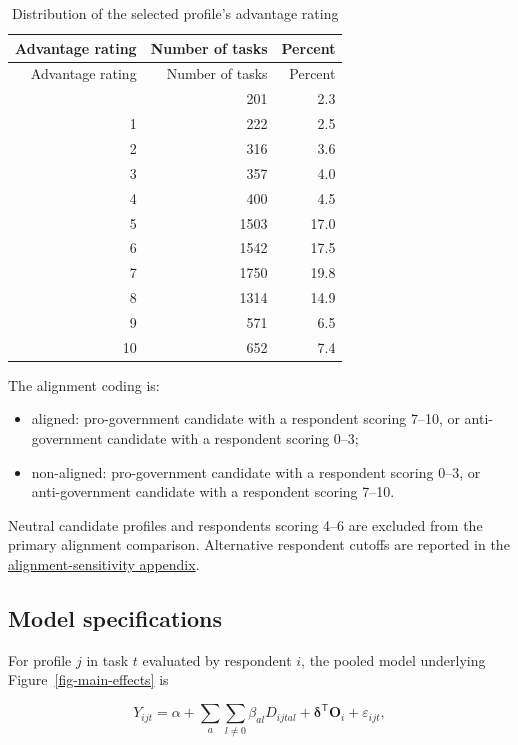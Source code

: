 \documentclass[
  letterpaper,
  DIV=11,
  numbers=noendperiod]{scrartcl}
\providecommand{\tightlist}{%
  \setlength{\itemsep}{0pt}\setlength{\parskip}{0pt}}
\begin{document}
\begin{longtable}[]{@{}rrr@{}}
\caption{Distribution of the selected profile's advantage
rating}\label{tbl-advantage-distribution}\tabularnewline
\toprule\noalign{}
Advantage rating & Number of tasks & Percent \\
\midrule\noalign{}
\endfirsthead
\toprule\noalign{}
Advantage rating & Number of tasks & Percent \\
\midrule\noalign{}
\endhead
\bottomrule\noalign{}
\endlastfoot
0 & 201 & 2.3 \\
1 & 222 & 2.5 \\
2 & 316 & 3.6 \\
3 & 357 & 4.0 \\
4 & 400 & 4.5 \\
5 & 1503 & 17.0 \\
6 & 1542 & 17.5 \\
7 & 1750 & 19.8 \\
8 & 1314 & 14.9 \\
9 & 571 & 6.5 \\
10 & 652 & 7.4 \\
\end{longtable}

The alignment coding is:

\begin{itemize}
\tightlist
\item
  aligned: pro-government candidate with a respondent scoring 7--10, or
  anti-government candidate with a respondent scoring 0--3;
\item
  non-aligned: pro-government candidate with a respondent scoring 0--3,
  or anti-government candidate with a respondent scoring 7--10.
\end{itemize}

Neutral candidate profiles and respondents scoring 4--6 are excluded
from the primary alignment comparison. Alternative respondent cutoffs
are reported in the
\hyperref[sec-alignment-sensitivity]{alignment-sensitivity appendix}.

\subsection*{Model specifications}\label{sec-models}

For profile \(j\) in task \(t\) evaluated by respondent \(i\), the
pooled model underlying Figure~\ref{fig-main-effects} is

\[
Y_{ijt}=\alpha+\sum_{a}\sum_{l\neq 0}\beta_{al}D_{ijtal}+\boldsymbol{\delta}^{\mathsf T}\mathbf{O}_{i}+\varepsilon_{ijt},
\]
\end{document}
